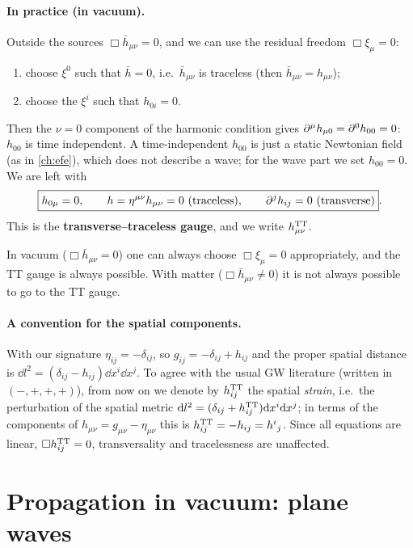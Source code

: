 \paragraph{In practice (in vacuum).} Outside the sources $\Box\bar h_{\mu\nu}=0$, and we can use the residual freedom $\Box\xi_\mu=0$:
\begin{enumerate}
\item choose $\xi^0$ such that $\bar h=0$, i.e.\ $\bar h_{\mu\nu}$ is traceless (then $\bar h_{\mu\nu}=h_{\mu\nu}$);
\item choose the $\xi^i$ such that $h_{0i}=0$.
\end{enumerate}
Then the $\nu=0$ component of the harmonic condition gives $\pd^\mu h_{\mu0}=\pd^0h_{00}=0$: $h_{00}$ is time independent. A time-independent $h_{00}$ is just a static Newtonian field (as in \cref{ch:efe}), which does not describe a wave; for the wave part we set $h_{00}=0$. We are left with
\begin{equation}
  \boxed{h_{0\mu}=0,\qquad h=\eta^{\mu\nu}h_{\mu\nu}=0\ (\text{traceless}),\qquad\pd^jh_{ij}=0\ (\text{transverse})}.
\end{equation}
This is the \textbf{transverse--traceless gauge}, and we write $h^{\rm TT}_{\mu\nu}$.

\begin{remarkbox}[N.B.]
In vacuum ($\Box\bar h_{\mu\nu}=0$) one can always choose $\Box\xi_\mu=0$ appropriately, and the TT gauge is always possible. With matter ($\Box\bar h_{\mu\nu}\neq0$) it is not always possible to go to the TT gauge.
\end{remarkbox}

\paragraph{A convention for the spatial components.} With our signature $\eta_{ij}=-\delta_{ij}$, so $g_{ij}=-\delta_{ij}+h_{ij}$ and the proper spatial distance is $\dd l^2=(\delta_{ij}-h_{ij})\dd x^i\dd x^j$. To agree with the usual GW literature (written in $(-,+,+,+)$), from now on we denote by $h^{\rm TT}_{ij}$ the spatial \emph{strain}, i.e.\ the perturbation of the spatial metric $\dd l^2=(\delta_{ij}+h^{\rm TT}_{ij})\dd x^i\dd x^j$; in terms of the components of $h_{\mu\nu}=g_{\mu\nu}-\eta_{\mu\nu}$ this is $h^{\rm TT}_{ij}=-h_{ij}=h^i{}_j$. Since all equations are linear, $\Box h^{\rm TT}_{ij}=0$, transversality and tracelessness are unaffected.

\section{Propagation in vacuum: plane waves}

